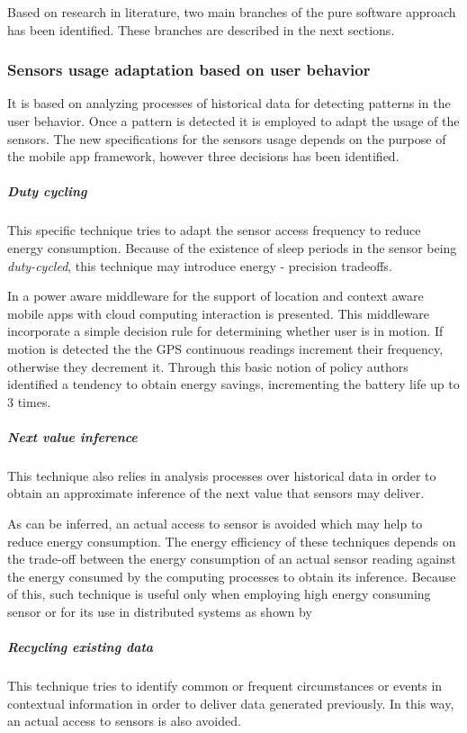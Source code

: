Based on research in literature, two main branches of the pure software approach has been identified. These branches are described in the next sections.

\subsubsection{Sensors usage adaptation based on user behavior}
\label{ssub:sensors_usage_adaptation_based_on_user_behavior}

It is based on analyzing processes of historical data for detecting patterns in the user behavior.
Once a pattern is detected it is employed to adapt the usage of the sensors.
The new specifications for the sensors usage depends on the purpose of the mobile app framework, however three decisions has been identified.

\subparagraph{Duty cycling}
\label{subp:duty_cycling}
This specific technique tries to adapt the sensor access frequency to reduce energy consumption.
Because of the existence of sleep periods in the sensor being \emph{duty-cycled}, this technique may introduce energy - precision tradeoffs.

In \cite{Perez-Torres2012} a power aware middleware for the support of location and context aware mobile apps with cloud computing interaction is presented.
This middleware incorporate a simple decision rule for determining whether user is in motion. If motion is detected the the GPS continuous readings increment their frequency, otherwise they decrement it.
Through this basic notion of policy authors identified a tendency to obtain energy savings, incrementing the battery life up to 3 times.

\subparagraph{Next value inference}
\label{subp:next_value_inference}
This technique also relies in analysis processes over historical data in order to obtain an approximate inference of the next value that sensors may deliver.

As can be inferred, an actual access to sensor is avoided which may help to reduce energy consumption.
The energy efficiency of these techniques depends on the trade-off between the energy consumption of an actual sensor reading against the energy consumed by the computing processes to obtain its inference. Because of this, such technique is useful only when employing high energy consuming sensor or for its use in distributed systems as shown by \cite{Musolesi2010}

\subparagraph{Recycling existing data}
\label{subp:recycling_exsisting_data}
This technique tries to identify common or frequent circumstances or events in contextual information in order to deliver data generated previously.
In this way, an actual access to sensors is also avoided.

